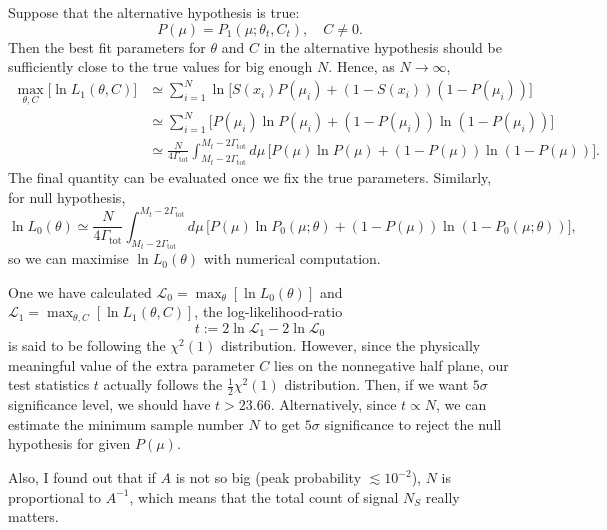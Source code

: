 \documentclass[10pt]{article}
\theoremstyle{definition}
\theoremstyle{remark}
\begin{document}
	Suppose that the alternative hypothesis is true:
	\[P(\mu)=P_{1}(\mu;\theta_{t},C_{t}),\quad C\neq0.\]
	Then the best fit parameters for $\theta$ and $C$ in the alternative hypothesis should be sufficiently close to the true values for big enough $N$.
	Hence, as $N\to\infty$,
	\begin{align*}
		\max_{\theta,C}\Big[\ln L_{1}(\theta,C)\Big]&\simeq\sum_{i=1}^{N}\ln\Big[S(x_{i})P(\mu_{i})+(1-S(x_{i}))(1-P(\mu_{i}))\Big]\\
		&\simeq\sum_{i=1}^{N}\Big[P(\mu_{i})\ln P(\mu_{i})+(1-P(\mu_{i}))\ln(1-P(\mu_{i}))\Big]\\
		&\simeq\frac{N}{4\Gamma_{\mathrm{tot}}}\int_{M_{t}-2\Gamma_{\mathrm{tot}}}^{M_{t}-2\Gamma_{\mathrm{tot}}}d\mu\,\Big[P(\mu)\ln P(\mu)+(1-P(\mu))\ln(1-P(\mu))\Big].
	\end{align*}
	The final quantity can be evaluated once we fix the true parameters.
	Similarly, for null hypothesis,
	\[\ln L_{0}(\theta)\simeq\frac{N}{4\Gamma_{\mathrm{tot}}}\int_{M_{t}-2\Gamma_{\mathrm{tot}}}^{M_{t}-2\Gamma_{\mathrm{tot}}}d\mu\,\Big[P(\mu)\ln P_{0}(\mu;\theta)+(1-P(\mu))\ln(1-P_{0}(\mu;\theta))\Big],\]
	so we can maximise $\ln L_{0}(\theta)$ with numerical computation.
	
	One we have calculated $\mathcal{L}_{0}=\max_{\theta}[\ln L_{0}(\theta)]$ and $\mathcal{L}_{1}=\max_{\theta,C}[\ln L_{1}(\theta,C)]$, the log-likelihood-ratio
	\[t:=2\ln\mathcal{L}_{1}-2\ln\mathcal{L}_{0}\]
	is said to be following the $\chi^{2}(1)$ distribution.
	However, since the physically meaningful value of the extra parameter $C$ lies on the nonnegative half plane, our test statistics $t$ actually follows the $\frac{1}{2}\chi^{2}(1)$ distribution\cite{cowan2011asymptotic}.
	Then, if we want $5\sigma$ significance level, we should have $t>23.66$.
	Alternatively, since $t\propto N$, we can estimate the minimum sample number $N$ to get $5\sigma$ significance to reject the null hypothesis for given $P(\mu)$.
	
	Also, I found out that if $A$ is not so big (peak probability $\lesssim 10^{-2}$), $N$ is proportional to $A^{-1}$, which means that the total count of signal $N_{S}$ really matters.
	
\end{document}
